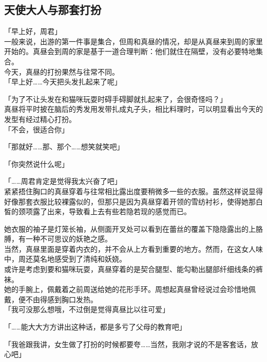 \subsection{天使大人与那套打扮}

「早上好，周君」\\

一般来说，出游的第一件事是集合，但周和真昼的情况，却是从真昼来到周的家里开始的。真昼会到周的家是基于一道合理判断：他们就住在隔壁，没有必要特地集合。\\

今天，真昼的打扮果然与往常不同。\\

「早上好……今天把头发扎起来了呢」

「为了不让头发在和猫咪玩耍时碍手碍脚就扎起来了，会很奇怪吗？」\\

真昼将平时披在脑后的秀发用发带扎成丸子头，相比料理时，可以明显看出今天的发型有经过精心打扮。\\

「不会，很适合你」

「那就好……那、那个……想笑就笑吧」

「你突然说什么呢」

「……周君肯定是觉得我太兴奋了吧」\\

紧紧捂住胸口的真昼穿着与往常相比露出度要稍微多一些的衣服。虽然这样说显得好像那套衣服比较裸露似的，但那只是因为真昼穿着开领的雪纺衬衫，使得她那白皙的颈项露了出来，导致看上去有些若隐若现的感觉而已。

她衣服的袖子是灯笼长袖，从侧面开叉处可以看到在蕾丝的覆盖下隐隐露出的上胳膊，有一种不可思议的妖艳之感。\\

当然，真昼里面是穿着内衣的，并不会从上方看到重要的地方。然而，在这女人味中，周还莫名地感受到了清纯和妖娆。\\

或许是考虑到要和猫咪玩耍，真昼穿着的是契合腿型、能勾勒出腿部纤细线条的裤袜。\\

她的手腕上，佩戴着之前周送给她的花形手环。周想起真昼曾经说过会珍惜地佩戴，便不由得感到胸口发热。\\

「我可没那么想哦，不过倒是觉得真昼比以往可爱」

「……能大大方方讲出这种话，都是多亏了父母的教育吧」

「我爸跟我讲，女生做了打扮的时候都要夸……当然，我刚才说的不是客套话，放心吧」

